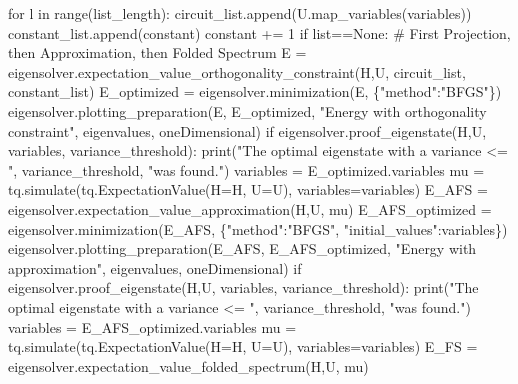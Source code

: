 \documentclass[
  letterpaper,
  DIV=11,
  numbers=noendperiod]{scrartcl}
\newenvironment{Shaded}{\begin{snugshade}}{\end{snugshade}}
\newcommand{\BuiltInTok}[1]{\textcolor[rgb]{0.00,0.23,0.31}{#1}}
\newcommand{\CommentTok}[1]{\textcolor[rgb]{0.37,0.37,0.37}{#1}}
\newcommand{\ControlFlowTok}[1]{\textcolor[rgb]{0.00,0.23,0.31}{#1}}
\newcommand{\DecValTok}[1]{\textcolor[rgb]{0.68,0.00,0.00}{#1}}
\newcommand{\KeywordTok}[1]{\textcolor[rgb]{0.00,0.23,0.31}{#1}}
\newcommand{\NormalTok}[1]{\textcolor[rgb]{0.00,0.23,0.31}{#1}}
\newcommand{\OperatorTok}[1]{\textcolor[rgb]{0.37,0.37,0.37}{#1}}
\newcommand{\StringTok}[1]{\textcolor[rgb]{0.13,0.47,0.30}{#1}}
\newcommand{\VariableTok}[1]{\textcolor[rgb]{0.07,0.07,0.07}{#1}}
\begin{document}
\begin{Shaded}
\begin{Highlighting}[]
    \ControlFlowTok{for}\NormalTok{ l }\KeywordTok{in} \BuiltInTok{range}\NormalTok{(list\_length):}
\NormalTok{        circuit\_list.append(U.map\_variables(variables))}
\NormalTok{        constant\_list.append(constant)}
\NormalTok{        constant }\OperatorTok{+=} \DecValTok{1}
    \ControlFlowTok{if} \BuiltInTok{list}\OperatorTok{==}\VariableTok{None}\NormalTok{:}
        \CommentTok{\# First Projection, then Approximation, then Folded Spectrum}
\NormalTok{        E }\OperatorTok{=}\NormalTok{ eigensolver.expectation\_value\_orthogonality\_constraint(H,U, circuit\_list, constant\_list)}
\NormalTok{        E\_optimized }\OperatorTok{=}\NormalTok{ eigensolver.minimization(E, \{}\StringTok{"method"}\NormalTok{:}\StringTok{"BFGS"}\NormalTok{\})}
\NormalTok{        eigensolver.plotting\_preparation(E, E\_optimized, }\StringTok{"Energy with orthogonality constraint"}\NormalTok{, eigenvalues, oneDimensional)}
        \ControlFlowTok{if}\NormalTok{ eigensolver.proof\_eigenstate(H,U, variables, variance\_threshold):}
                \BuiltInTok{print}\NormalTok{(}\StringTok{"The optimal eigenstate with a variance \textless{}= "}\NormalTok{, variance\_threshold, }\StringTok{"was found."}\NormalTok{)}
\NormalTok{        variables }\OperatorTok{=}\NormalTok{ E\_optimized.variables}
\NormalTok{        mu }\OperatorTok{=}\NormalTok{ tq.simulate(tq.ExpectationValue(H}\OperatorTok{=}\NormalTok{H, U}\OperatorTok{=}\NormalTok{U), variables}\OperatorTok{=}\NormalTok{variables)}
\NormalTok{        E\_AFS }\OperatorTok{=}\NormalTok{ eigensolver.expectation\_value\_approximation(H,U, mu)}
\NormalTok{        E\_AFS\_optimized }\OperatorTok{=}\NormalTok{ eigensolver.minimization(E\_AFS, \{}\StringTok{"method"}\NormalTok{:}\StringTok{"BFGS"}\NormalTok{, }\StringTok{"initial\_values"}\NormalTok{:variables\})}
\NormalTok{        eigensolver.plotting\_preparation(E\_AFS, E\_AFS\_optimized, }\StringTok{"Energy with approximation"}\NormalTok{, eigenvalues, oneDimensional)}
        \ControlFlowTok{if}\NormalTok{ eigensolver.proof\_eigenstate(H,U, variables, variance\_threshold):}
                \BuiltInTok{print}\NormalTok{(}\StringTok{"The optimal eigenstate with a variance \textless{}= "}\NormalTok{, variance\_threshold, }\StringTok{"was found."}\NormalTok{)}
\NormalTok{        variables }\OperatorTok{=}\NormalTok{ E\_AFS\_optimized.variables}
\NormalTok{        mu }\OperatorTok{=}\NormalTok{ tq.simulate(tq.ExpectationValue(H}\OperatorTok{=}\NormalTok{H, U}\OperatorTok{=}\NormalTok{U), variables}\OperatorTok{=}\NormalTok{variables)}
\NormalTok{        E\_FS }\OperatorTok{=}\NormalTok{ eigensolver.expectation\_value\_folded\_spectrum(H,U, mu)}

\end{Highlighting}
\end{Shaded}
\end{document}
